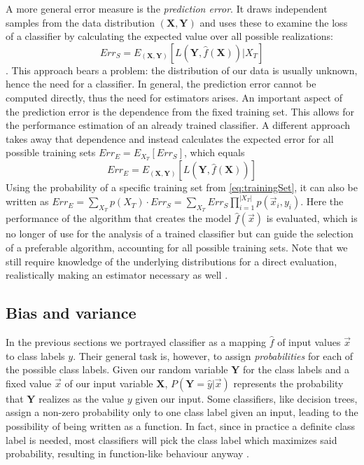 A more general error measure is the \textit{prediction error}. It draws independent samples from the data distribution $(\mathbf{X}, \mathbf{Y})$ and uses these to examine the loss of a classifier by calculating the expected value over all possible realizations:
\begin{equation}
Err_{S} = E_{(\mathbf{X}, \mathbf{Y})}[L(\mathbf{Y}, \hat{f}(\mathbf{X})) | X_T]
\end{equation}
\cite{RodriguezEtAl2013}. This approach bears a problem: the distribution of our data is usually unknown, hence the need for a classifier. In general, the prediction error cannot be computed directly, thus the need for estimators arises.
An important aspect of the prediction error is the dependence from the fixed training set. This allows for the performance estimation of an already trained classifier. A different approach takes away that dependence and instead calculates the expected error for all possible training sets $Err_{E} = E_{X_T}[Err_{S}]$, which equals
\begin{equation}
Err_{E} = E_{(\mathbf{X}, \mathbf{Y})}[L(\mathbf{Y}, \hat{f}(\mathbf{X}))]
\end{equation}
Using the probability of a specific training set from \ref{eq:trainingSet}, it can also be written as $Err_{E} = \sum_{X_T}^{} p(X_T) \cdot Err_S = \sum_{X_T}^{} Err_S \prod_{i=1}^{|X_T|} p(\vec{x}_i, y_i)$. Here the performance of the algorithm that creates the model $\hat{f}(\vec{x})$ is evaluated, which is no longer of use for the analysis of a trained classifier but can guide the selection of a preferable algorithm, accounting for all possible training sets. Note that we still require knowledge of the underlying distributions for a direct evaluation, realistically making an estimator necessary as well \cite{HastieEtAl2009}.

\subsection{Bias and variance}
In the previous sections we portrayed classifier as a mapping $\hat{f}$ of input values $\vec{x}$ to class labels $y$. Their general task is, however, to assign \textit{probabilities} for each of the possible class labels. Given our random variable $\mathbf{Y}$ for the class labels and a fixed value $\vec{x}$ of our input variable $\mathbf{X}$, $P(\mathbf{Y} = \hat{y} | \vec{x})$ represents the probability that $\mathbf{Y}$ realizes as the value $y$ given our input. Some classifiers, like decision trees, assign a non-zero probability only to one class label given an input, leading to the possibility of being written as a function. In fact, since in practice a definite class label is needed, most classifiers will pick the class label which maximizes said probability, resulting in function-like behaviour anyway \cite{KohaviEtAl1996}.

